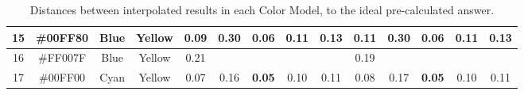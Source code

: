 \begin{table}[!htbp]
{\begin{tabular}{@{}cccccccccccccc@{}}
    \multicolumn{1}{c}{15}      & \multicolumn{1}{c}{\cellcolor[HTML]{00FF80}\#00FF80} & \multicolumn{1}{c|}{Blue}    & \multicolumn{1}{c|}{Yellow}  & \multicolumn{1}{c|}{0.09}                                   & \multicolumn{1}{c|}{0.30}                                  & \multicolumn{1}{c|}{\cellcolor[HTML]{32CB00}\textbf{0.06}} & \multicolumn{1}{c|}{0.11}  & \multicolumn{1}{c||}{0.13}                                  & \multicolumn{1}{c|}{0.11}                                  & \multicolumn{1}{c|}{0.30}                                  & \multicolumn{1}{c|}{\cellcolor[HTML]{32CB00}\textbf{0.06}} & \multicolumn{1}{c|}{0.11}                                  & \multicolumn{1}{c|}{0.13}                                  \\ \midrule
    \multicolumn{1}{c}{16}      & \multicolumn{1}{c}{\cellcolor[HTML]{FF007F}\#FF007F} & \multicolumn{1}{c|}{Blue}    & \multicolumn{1}{c|}{Yellow}  & \multicolumn{1}{c|}{0.21}                                   & \multicolumn{4}{c||}{}                                                                                                                                                                                             & \multicolumn{1}{c|}{0.19}                                  & \multicolumn{4}{c|}{}                                                                                                                                                                                                                             \\ \midrule
    \multicolumn{1}{c}{17}      & \multicolumn{1}{c}{\cellcolor[HTML]{00FF00}\#00FF00} & \multicolumn{1}{c|}{Cyan}    & \multicolumn{1}{c|}{Yellow}  & \multicolumn{1}{c|}{0.07}                                   & \multicolumn{1}{c|}{0.16}                                  & \multicolumn{1}{c|}{\cellcolor[HTML]{32CB00}\textbf{0.05}} & \multicolumn{1}{c|}{0.10}  & \multicolumn{1}{c||}{0.11}                                  & \multicolumn{1}{c|}{0.08}                                  & \multicolumn{1}{c|}{0.17}                                  & \multicolumn{1}{c|}{\cellcolor[HTML]{32CB00}\textbf{0.05}} & \multicolumn{1}{c|}{0.10}                                  & \multicolumn{1}{c|}{0.11}                                  \\ \bottomrule
  \end{tabular}}
  \caption[Distances of Results Interpolated in each Color Model]{Distances between interpolated results in each Color Model, to the ideal pre-calculated answer.}
  \vspace{-5pt}
  \label{table:colormodels_distances_labonline}
\end{table}

